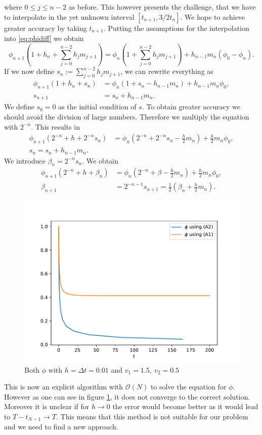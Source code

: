 \documentclass[12pt,a4paper,twoside, open=right]{scrreprt}
\theoremstyle{definition}
\theoremstyle{plain}
\begin{document}
where $0\le j\le n-2$ as before. This however presents the challenge, that we have to interpolate in the yet unknown interval $[t_{n+1},3/2t_{n}]$. We hope to achieve greater accuracy by taking $t_{n+1}$. Putting the assumptions for the interpolation into \eqref{eq:phidiff} we obtain
\begin{equation}
    \phi_{n+1}(1 + h_n + \sum_{j=0}^{n-2}h_jm_{j+1})=\phi_n(1+\sum_{j=0}^{n-2}h_jm_{j+1})+h_{n-1}m_n(\phi_0-\phi_n).
\end{equation}
If we now define $s_n:=\sum_{j=0}^{n-2}h_jm_{j+1}$, we can rewrite everything as
\begin{align}
    \phi_{n+1}(1+h_n+s_n)&=\phi_n(1+s_n-h_{n-1}m_n)+h_{n-1}m_n\phi_0,\\
    s_{n+1}&=s_n+h_{n-1}m_n.
\end{align}
We define $s_0=0$ as the initial condition of $s$. To obtain greater accuracy we should avoid the division of large numbers. Therefore we multiply the equation with $2^{-n}$. This results in
\begin{align}
    \phi_{n+1}(2^{-n}+h+2^{-n}s_n) &= \phi_n(2^{-n}+2^{-n}s_n-\frac{h}{2}m_n)+\frac{h}{2}m_n\phi_0,\\
    s_n=s_n+h_{n-1}m_n.
\end{align}
We introduce $\beta_n=2^{-n}s_n$. We obtain
\begin{align}
     \phi_{n+1}(2^{-n}+h+\beta_n) &= \phi_n(2^{-n}+\beta-\frac{h}{2}m_n)+\frac{h}{2}m_n\phi_0,\\
     \beta_{n+1} &= 2^{-n-1}s_{n+1}=\frac{1}{2}(\beta_n+\frac{h}{2}m_n) .
\end{align}
\begin{figure}
    \centering
    \includegraphics[width=\textwidth]{Phidiff}
    \caption{Both $\phi$ with $h=\Delta t=0.01$ and $v_1=1.5,~v_2=0.5$}
    \label{fig:phifalse}
\end{figure}
This is now an explicit algorithm with $\mathcal{O}(N)$ to solve the equation for $\phi$. However as one can see in figure \ref{fig:phifalse}, it does not converge to the correct solution. Moreover it is unclear if for $h\to 0$ the error would become better as it would lead to $T-t_{N-1}\to T$. This means that this method is not suitable for our problem and we need to find a new approach.
\end{document}

